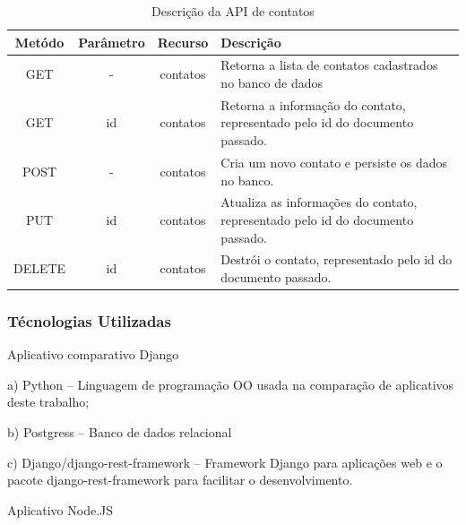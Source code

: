  
  \begin{table}[H]
    \centering
    \footnotesize
    \vspace{0.5cm}
    \setlength{\abovecaptionskip}{0pt}
    \setlength{\belowcaptionskip}{0pt}
    \caption[Descrição da API de contatos]{Descrição da API de contatos}
    \label{tab:api-descricao-contato}
    \begin{tabular}{c|c|c|p{8cm}}
      \hline \hline
      Metódo  &	Parâmetro &	Recurso &	Descrição \\
      \hline \hline
      GET	& -	& contatos	& Retorna a lista de contatos 
					  cadastrados no banco de dados \\
      GET	& id	& contatos	& Retorna a informação do contato, representado pelo 
					  id do documento passado. \\
      POST	& -	& contatos	& Cria um novo contato e persiste os dados no banco. \\
      PUT	& id	& contatos	& Atualiza as informações do contato, representado pelo id do documento passado. \\
      DELETE	& id	& contatos	& Destrói o contato, representado pelo id do documento passado. \\
      \hline \hline
    \end{tabular}
  \end{table}
  
\subsubsection{Técnologias Utilizadas}


  Aplicativo comparativo Django
    
    \begin{compactitem}
      \item[a)] Python – Linguagem de programação OO usada na comparação de aplicativos deste trabalho;
      \item[b)] Postgress – Banco de dados relacional
      \item[c)] Django/django-rest-framework – Framework Django para aplicações web e o pacote django-rest-framework
      para facilitar o desenvolvimento.
    \end{compactitem}
    
  Aplicativo Node.JS
  
